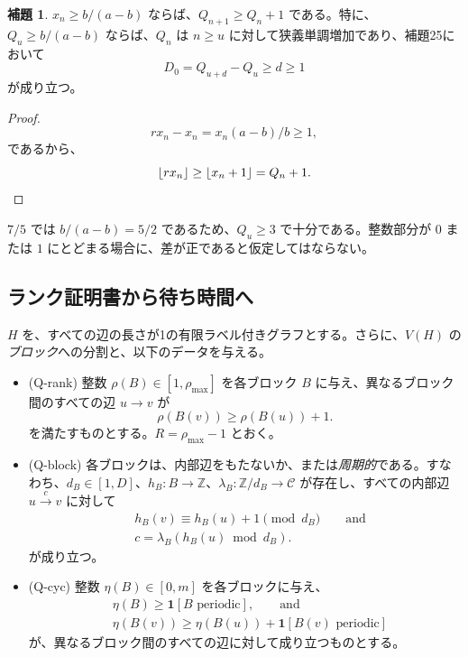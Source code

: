 \documentclass[11pt,reqno]{amsart}
\theoremstyle{definition}
\newtheorem{lemma}[theorem]{補題}
\theoremstyle{definition}
\theoremstyle{remark}
\providecommand{\tightlist}{\setlength{\itemsep}{0pt}\setlength{\parskip}{0pt}}
\begin{document}
\begin{samepage}
\begin{lemma}\leavevmode\label{thm:26}
\(x_n\ge b/(a-b)\) ならば、\(Q_{n+1}\ge Q_n+1\) である。特に、\(Q_u\ge b/(a-b)\) ならば、\(Q_n\) は \(n\ge u\) に対して狭義単調増加であり、補題25において
\[
D_0=Q_{u+d}-Q_u\ge d\ge1
\]
が成り立つ。
\label{thm-end:26}
\end{lemma}
\end{samepage}

\begin{proof}\leavevmode\label{proof:26}
\[
rx_n-x_n=x_n(a-b)/b\ge1,
\]
であるから、
\[
\lfloor rx_n\rfloor\ge\lfloor x_n+1\rfloor=Q_n+1.\qedhere
\]
\end{proof}

\(7/5\) では \(b/(a-b)=5/2\) であるため、\(Q_u\ge3\) で十分である。整数部分が \(0\) または \(1\) にとどまる場合に、差が正であると仮定してはならない。

\subsection{ランク証明書から待ち時間へ}\label{sec:6.2}

\(H\) を、すべての辺の長さが1の有限ラベル付きグラフとする。さらに、\(V(H)\) の\emph{ブロック}への分割と、以下のデータを与える。

\begin{itemize}
\tightlist
\item
  (Q-rank) 整数 \(\rho(B)\in[1,\rho_{\max}]\) を各ブロック \(B\) に与え、異なるブロック間のすべての辺 \(u\to v\) が
  \[
  \rho(B(v))\ge\rho(B(u))+1.
  \]
  を満たすものとする。\(R=\rho_{\max}-1\) とおく。
\item
  (Q-block) 各ブロックは、内部辺をもたないか、または\emph{周期的}である。すなわち、\(d_B\in[1,D]\)、\(h_B:B\to\mathbb Z\)、\(\lambda_B:\mathbb Z/d_B\to\mathcal C\) が存在し、すべての内部辺 \(u\xrightarrow{c}v\) に対して
  \[
  \begin{aligned}
  &h_B(v)\equiv h_B(u)+1\pmod{d_B}\qquad\text{and}\\
  &c=\lambda_B(h_B(u)\bmod d_B).
  \end{aligned}
  \]
  が成り立つ。
\item
  (Q-cyc) 整数 \(\eta(B)\in[0,m]\) を各ブロックに与え、
  \[
  \begin{aligned}
  &\eta(B)\ge\mathbf 1[B\text{ periodic}],\qquad\text{and}\\
  &\eta(B(v))\ge\eta(B(u))+\mathbf 1[B(v)\text{ periodic}]
  \end{aligned}
  \]
  が、異なるブロック間のすべての辺に対して成り立つものとする。
\end{itemize}
\end{document}
